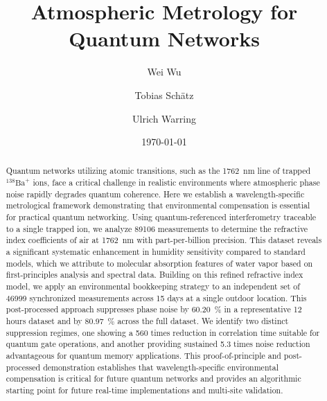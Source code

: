 \documentclass[aps,pra,reprint,groupedaddress,twocolumn,superscriptaddress]{revtex4-2}
\begin{document}

\title{Atmospheric Metrology for Quantum Networks}

\author{Wei Wu}
\author{Tobias Schätz}
\author{Ulrich Warring}

\date{\today}

\begin{abstract}
Quantum networks utilizing atomic transitions, such as the \SI{1762}{\nano\meter} line of trapped $^{138}\text{Ba}^+$ ions, face a critical challenge in realistic environments where atmospheric phase noise rapidly degrades quantum coherence. Here we establish a wavelength-specific metrological framework demonstrating that environmental compensation is essential for practical quantum networking. Using quantum-referenced interferometry traceable to a single trapped ion, we analyze \num{89106} measurements to determine the refractive index coefficients of air at \SI{1762}{\nano\meter} with part-per-billion precision. This dataset reveals a significant systematic enhancement in humidity sensitivity compared to standard models, which we attribute to molecular absorption features of water vapor based on first-principles analysis and spectral data. Building on this refined refractive index model, we apply an environmental bookkeeping strategy to an independent set of \num{46999} synchronized measurements across 15 days at a single outdoor location. This post-processed approach suppresses phase noise by \SI{60.20}{\percent} in a representative 12 hours dataset and by \SI{80.97}{\percent} across the full dataset. We identify two distinct suppression regimes, one showing a 560 times reduction in correlation time suitable for quantum gate operations, and another providing sustained 5.3 times noise reduction advantageous for quantum memory applications. This proof-of-principle and post-processed demonstration establishes that wavelength-specific environmental compensation is critical for future quantum networks and provides an algorithmic starting point for future real-time implementations and multi-site validation.
\end{abstract}
\end{document}
